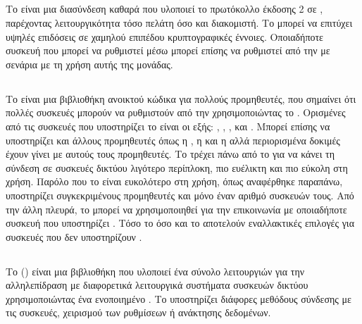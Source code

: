 \subsection{}
Το  είναι μια διασύνδεση καθαρά  που υλοποιεί το πρωτόκολλο  έκδοσης 2 σε , παρέχοντας λειτουργικότητα τόσο πελάτη όσο και διακομιστή.
Το  μπορεί να επιτύχει υψηλές επιδόσεις σε χαμηλού επιπέδου κρυπτογραφικές έννοιες.
Οποιαδήποτε συσκευή που μπορεί να ρυθμιστεί μέσω  μπορεί επίσης να ρυθμιστεί από την  με σενάρια με τη χρήση αυτής της μονάδας.

\subsection{}
Το  είναι μια βιβλιοθήκη ανοικτού κώδικα για πολλούς προμηθευτές, που σημαίνει ότι πολλές συσκευές μπορούν να ρυθμιστούν από την 
χρησιμοποιώντας το .
Ορισμένες από τις συσκευές που υποστηρίζει το  είναι οι εξής: , , ,  και . 
Μπορεί επίσης να υποστηρίζει και άλλους προμηθευτές όπως η , η  και η  αλλά περιορισμένα 
δοκιμές έχουν γίνει με αυτούς τους προμηθευτές.
Το  τρέχει πάνω από το  για να κάνει τη σύνδεση  σε συσκευές δικτύου λιγότερο περίπλοκη, πιο ευέλικτη και πιο εύκολη στη χρήση. Παρόλο που το  είναι ευκολότερο στη χρήση, όπως αναφέρθηκε 
παραπάνω, υποστηρίζει συγκεκριμένους προμηθευτές και μόνο έναν αριθμό συσκευών τους. Από την άλλη πλευρά,
το  μπορεί να χρησιμοποιηθεί για την επικοινωνία με οποιαδήποτε συσκευή που υποστηρίζει .
Τόσο το όσο και το  αποτελούν εναλλακτικές επιλογές για συσκευές που δεν υποστηρίζουν 
.

\subsection{}
Το  () είναι μια βιβλιοθήκη  που υλοποιεί ένα σύνολο λειτουργιών για την αλληλεπίδραση με διαφορετικά λειτουργικά συστήματα συσκευών δικτύου χρησιμοποιώντας ένα ενοποιημένο .
Το  υποστηρίζει διάφορες μεθόδους σύνδεσης με τις συσκευές, χειρισμού των ρυθμίσεων ή ανάκτησης δεδομένων.




